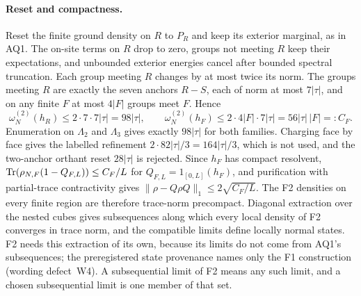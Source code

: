 \paragraph{Reset and compactness.}
Reset the finite ground density on $R$ to $P_R$ and keep its exterior
marginal, as in AQ1. The on-site terms on $R$ drop to zero, groups not
meeting $R$ keep their expectations, and unbounded exterior energies cancel
after bounded spectral truncation. Each group meeting $R$ changes by at most
twice its norm. The groups meeting $R$ are exactly the seven anchors $R-S$,
each of norm at most $7|\tau|$, and on any finite $F$ at most $4|F|$ groups
meet $F$. Hence
\begin{equation}
 \omega^{(2)}_N(h_R)\le2\cdot7\cdot7|\tau|=98|\tau|,\qquad
 \omega^{(2)}_N(h_F)\le2\cdot4|F|\cdot7|\tau|=56|\tau|\,|F|=:C_F .
 \label{eq:ay1-reset}
\end{equation}
Enumeration on $\Lambda_2$ and $\Lambda_3$ gives exactly $98|\tau|$ for both
families. Charging face by face gives the labelled refinement
$2\cdot82|\tau|/3=164|\tau|/3$, which is not used, and the two-anchor orthant
reset $28|\tau|$ is rejected. Since $h_F$ has compact resolvent,
$\operatorname{Tr}(\rho_{N,F}(1-Q_{F,L}))\le C_F/L$ for $Q_{F,L}=1_{[0,L]}(h_F)$, and
purification with partial-trace contractivity gives
$\lVert \rho-Q\rho Q\rVert_1\le2\sqrt{C_F/L}$. The F2 densities on every finite
region are therefore trace-norm precompact. Diagonal extraction over the
nested cubes gives subsequences along which every local density of F2
converges in trace norm, and the compatible limits define locally normal
states. F2 needs this extraction of its own, because its limits do not come
from AQ1's subsequences; the preregistered state provenance names only the F1
construction (wording defect~W4). A subsequential limit of F2 means any such
limit, and a chosen subsequential limit is one member of that set.

